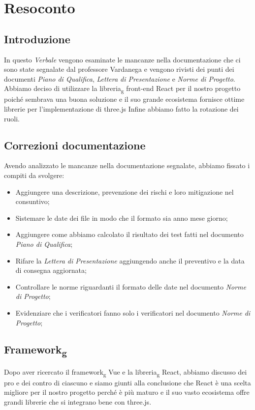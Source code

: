\section{Resoconto}
\subsection{Introduzione}

In questo \textit{Verbale} vengono esaminate le mancanze nella documentazione che ci sono state segnalate dal professore Vardanega e vengono rivisti dei punti dei documenti \textit{Piano di Qualifica}, \textit{Lettera di Presentazione} e \textit{Norme di Progetto}.
Abbiamo deciso di utilizzare la libreria\textsubscript{g} front-end React per il nostro progetto poiché sembrava una buona soluzione e il suo grande ecosistema fornisce ottime librerie per l'implementazione di three.js
Infine abbiamo fatto la rotazione dei ruoli.

\subsection{Correzioni documentazione}
Avendo analizzato le mancanze nella documentazione segnalate, abbiamo fissato i compiti da svolgere:
\begin{itemize}
    \item Aggiungere una descrizione, prevenzione dei rischi e loro mitigazione nel consuntivo;
    \item Sistemare le date dei file in modo che il formato sia anno mese giorno;
    \item Aggiungere come abbiamo calcolato il risultato dei test fatti nel documento \textit{Piano di Qualifica};
    \item Rifare la \textit{Lettera di Presentazione} aggiungendo anche il preventivo e la data di consegna aggiornata;
    \item Controllare le norme riguardanti il formato delle date nel documento \textit{Norme di Progetto};
    \item Evidenziare che i verificatori fanno solo i verificatori nel documento \textit{Norme di Progetto};
\end{itemize}
\subsection{Framework\textsubscript{g}}
Dopo aver ricercato il framework\textsubscript{g} Vue e la libreria\textsubscript{g} React, abbiamo discusso dei pro e dei contro di ciascuno e siamo giunti alla conclusione che React è una scelta migliore per il nostro progetto perché è più maturo e il suo vasto ecosistema offre grandi librerie che si integrano bene con three.js.
